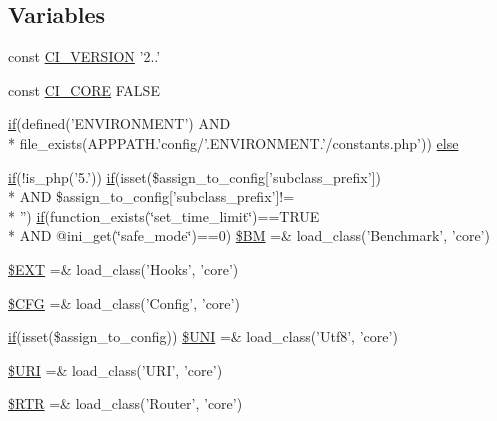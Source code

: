 \subsection*{Variables}
\begin{DoxyCompactItemize}
\item 
const \hyperlink{_code_igniter_8php_a32e3c3927ba8ec93df92327dfd85d564}{C\-I\-\_\-\-V\-E\-R\-S\-I\-O\-N} '2..'
\item 
const \hyperlink{_code_igniter_8php_aefc9cd12024bd0164da3aeafe9635c30}{C\-I\-\_\-\-C\-O\-R\-E} F\-A\-L\-S\-E
\item 
\hyperlink{bootstrap_8min_8js_afac0f023df4d3c79a9b54c1aae1fbdc3}{if}(defined('E\-N\-V\-I\-R\-O\-N\-M\-E\-N\-T') A\-N\-D \\*
file\-\_\-exists(A\-P\-P\-P\-A\-T\-H.'config/'.E\-N\-V\-I\-R\-O\-N\-M\-E\-N\-T.'/constants.\-php')) \hyperlink{_code_igniter_8php_a92382071610da06a8cb62a44c4530e10}{else}
\item 
\hyperlink{bootstrap_8min_8js_afac0f023df4d3c79a9b54c1aae1fbdc3}{if}(!is\-\_\-php('5.')) \hyperlink{bootstrap_8min_8js_afac0f023df4d3c79a9b54c1aae1fbdc3}{if}(isset(\$assign\-\_\-to\-\_\-config\mbox{[}'subclass\-\_\-prefix'\mbox{]}) \\*
A\-N\-D \$assign\-\_\-to\-\_\-config\mbox{[}'subclass\-\_\-prefix'\mbox{]}!= \\*
'') \hyperlink{bootstrap_8min_8js_afac0f023df4d3c79a9b54c1aae1fbdc3}{if}(function\-\_\-exists(\char`\"{}set\-\_\-time\-\_\-limit\char`\"{})==T\-R\-U\-E \\*
A\-N\-D @ini\-\_\-get(\char`\"{}safe\-\_\-mode\char`\"{})==0) \hyperlink{_code_igniter_8php_a00c84dd4b16006bcf296997b833ebfac}{\$\-B\-M} =\& load\-\_\-class('Benchmark', 'core')
\item 
\hyperlink{_code_igniter_8php_ab97aae9bc0aae04b84d360a29a3c035b}{\$\-E\-X\-T} =\& load\-\_\-class('Hooks', 'core')
\item 
\hyperlink{_code_igniter_8php_adb9373e11e42b2cd55d1fe249ae72deb}{\$\-C\-F\-G} =\& load\-\_\-class('Config', 'core')
\item 
\hyperlink{bootstrap_8min_8js_afac0f023df4d3c79a9b54c1aae1fbdc3}{if}(isset(\$assign\-\_\-to\-\_\-config)) \hyperlink{_code_igniter_8php_a0eedd12db0d3774c174f0dba59577357}{\$\-U\-N\-I} =\& load\-\_\-class('Utf8', 'core')
\item 
\hyperlink{_code_igniter_8php_a630d83d898b39ad4568906284f7f5336}{\$\-U\-R\-I} =\& load\-\_\-class('U\-R\-I', 'core')
\item 
\hyperlink{_code_igniter_8php_a4d6c9285c8483e4708a57a4128fc95f3}{\$\-R\-T\-R} =\& load\-\_\-class('Router', 'core')

\end{DoxyCompactItemize}

